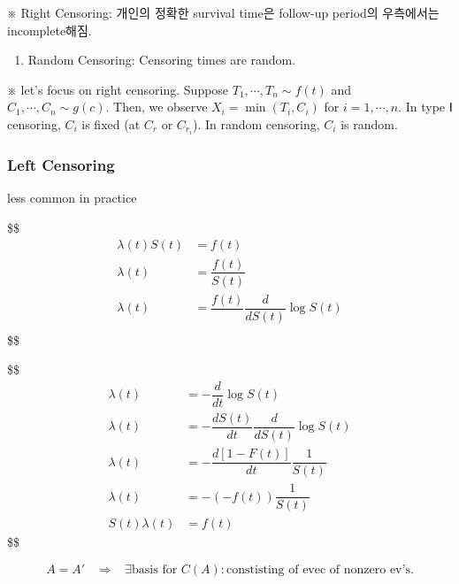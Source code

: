 \documentclass[
]{book}
\providecommand{\tightlist}{%
  \setlength{\itemsep}{0pt}\setlength{\parskip}{0pt}}
\begin{document}
{{{※ Right Censoring: 개인의 정확한 survival time은 follow-up period의 우측에서는 incomplete해짐.

\begin{enumerate}
\def\labelenumi{\arabic{enumi}.}
\setcounter{enumi}{2}
\tightlist
\item
  Random Censoring:
  Censoring times are random.
\end{enumerate}

※ let's focus on right censoring. Suppose \(T_1 , \cdots, T_n \sim f(t)\) and \(C_1 , \cdots, C_n \sim g(c)\). Then, we observe \(X_i = \min(T_i , C_i )\) for \(i = 1, \cdots, n\). In type Ⅰ censoring, \(C_i\) is fixed (at \(C_r\) or \(C_{r_i}\)). In random censoring, \(C_i\) is random.

\hypertarget{left-censoring}{%
\subsubsection{Left Censoring}\label{left-censoring}}

less common in practice

\$\$
\begin{align}

\lambda(t) S(t)&= f(t) \\

\lambda(t) &= \dfrac{f(t)}{S(t)} \\

\lambda(t) &= \dfrac{f(t)}{} \dfrac{d}{dS(t)}\log S(t) \\


\end{align}
\$\$

\$\$
\begin{align}

\lambda(t) &= - \dfrac{d}{dt} \log S(t) \\

\lambda(t) &= - \dfrac {dS(t)}{dt} \dfrac{d}{dS(t)} \log S(t) \\

\lambda(t) &= - \dfrac {d[1-F(t)]}{dt} \dfrac{1}{S(t)} \\

\lambda(t) &= - (-f(t)) \dfrac{1}{S(t)} \\

S(t)\lambda(t) &= f(t)

\end{align}
\$\$

\[
A = A'\; \; \; \Longrightarrow \; \; \; \exists \text{basis for } C(A):\text{constisting of evec of nonzero ev's.}
\]

}}}
\end{document}
